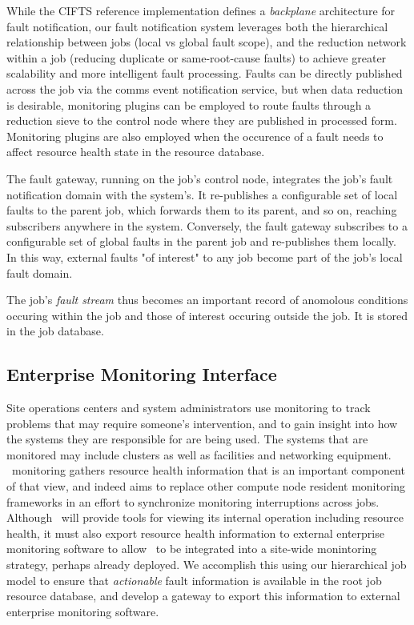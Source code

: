 While the CIFTS reference implementation defines a {\em backplane}
architecture for fault notification, our fault notification system
leverages both the hierarchical relationship between jobs (local vs global
fault scope), and the reduction network within a job (reducing duplicate
or same-root-cause faults) to achieve greater scalability and more intelligent
fault processing.
Faults can be directly published across the job via the comms event
notification service, but when data reduction is desirable, monitoring 
plugins can be employed to route faults through a reduction sieve to
the control node where they are published in processed form.
Monitoring plugins are also employed when the occurence of a fault needs
to affect resource health state in the resource database.

The fault gateway, running on the job's control node, 
integrates the job's fault notification domain with the system's.
It re-publishes a configurable set of local faults to the parent job, 
which forwards them to its parent, and so on, reaching subscribers anywhere
in the system.
Conversely, the fault gateway subscribes to a configurable set of global
faults in the parent job and re-publishes them locally.
In this way, external faults "of interest" to any job become part of the
job's local fault domain.

The job's {\em fault stream} thus becomes an important record of anomolous
conditions occuring within the job and those of interest occuring outside
the job.  It is stored in the job database.

\subsection{Enterprise Monitoring Interface}

Site operations centers and system administrators use
monitoring to track problems that may require someone's intervention, and
to gain insight into how the systems they are responsible for are being used.
The systems that are monitored may include clusters as well as facilities
and networking equipment.
\ngrm\ monitoring gathers resource health information that is an important
component of that view, and indeed aims to replace other compute node
resident monitoring frameworks in an effort to synchronize monitoring
interruptions across jobs.
Although \ngrm\ will provide tools for viewing its internal operation
including resource health, it must also export resource health information
to external enterprise monitoring software to allow \ngrm\ to be integrated
into a site-wide monintoring strategy, perhaps already deployed.
We accomplish this using our hierarchical job model to ensure that
{\em actionable} fault information is available in the root job resource
database, and develop a gateway to export this information
to external enterprise monitoring software.

